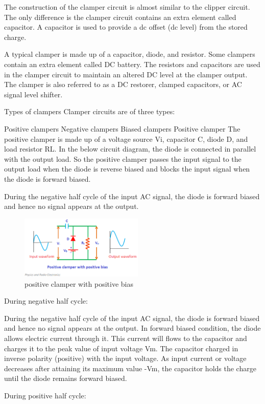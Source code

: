\documentclass{article}
\begin{document}
The construction of the clamper circuit is almost similar to the clipper circuit. The only difference is the clamper circuit contains an extra element called capacitor. A capacitor is used to provide a dc offset (dc level) from the stored charge.

A typical clamper is made up of a capacitor, diode, and resistor. Some clampers contain an extra element called DC battery. The resistors and capacitors are used in the clamper circuit to maintain an altered DC level at the clamper output. The clamper is also referred to as a DC restorer, clamped capacitors, or AC signal level shifter.

Types of clampers
Clamper circuits are of three types:

Positive clampers
Negative clampers
Biased clampers
Positive clamper
The positive clamper is made up of a voltage source Vi, capacitor C, diode D, and load resistor RL. In the below circuit diagram, the diode is connected in parallel with the output load. So the positive clamper passes the input signal to the output load when the diode is reverse biased and blocks the input signal when the diode is forward biased.

During the negative half cycle of the input AC signal, the diode is forward biased and hence no signal appears at the output. 
\begin{figure}[H]
	\centering
	\includegraphics[height=3cm]{positiveclamperwithpositivebias.png}
	\caption{positive clamper with positive bias}
\end{figure}
During negative half cycle:

During the negative half cycle of the input AC signal, the diode is forward biased and hence no signal appears at the output. In forward biased condition, the diode allows electric current through it. This current will flows to the capacitor and charges it to the peak value of input voltage Vm. The capacitor charged in inverse polarity (positive) with the input voltage. As input current or voltage decreases after attaining its maximum value -Vm, the capacitor holds the charge until the diode remains forward biased.

During positive half cycle:
\end{document}
